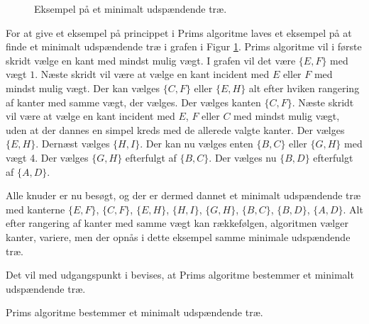 

\begin{figure}[!h]
  \centering
  \scalebox{0.8}{}
  \caption{Eksempel på et minimalt udspændende træ.}
  \label{eks_prim}
\end{figure}

\begin{exmp}
For at give et eksempel på princippet i Prims algoritme laves et eksempel på at finde et minimalt udspændende træ i grafen i Figur \ref{eks_prim}. 
Prims algoritme vil i første skridt vælge en kant med mindst mulig vægt. 
I grafen vil det være $\lbrace E,F \rbrace$ med vægt $1$. 
Næste skridt vil være at vælge en kant incident med $E$ eller $F$ med mindst mulig vægt. 
Der kan vælges $\lbrace C,F \rbrace$ eller $\lbrace E,H \rbrace$ alt efter hviken rangering af kanter med samme vægt, der vælges. 
Der vælges kanten $\lbrace C,F \rbrace$. 
Næste skridt vil være at vælge en kant incident med $E$, $F$ eller $C$ med mindst mulig vægt, uden at der dannes en simpel kreds med de allerede valgte kanter. 
Der vælges $\lbrace E,H \rbrace$. Dernæst vælges $\lbrace H,I \rbrace$. 
Der kan nu vælges enten $\lbrace B,C \rbrace$  eller $\lbrace G,H \rbrace$ med vægt 4. 
Der vælges $\lbrace G,H \rbrace$ efterfulgt af $\lbrace B,C \rbrace$. 
Der vælges nu $\lbrace B,D \rbrace$ efterfulgt af $\lbrace A,D \rbrace$.

Alle knuder er nu besøgt, og der er dermed dannet et minimalt udspændende træ med kanterne $\lbrace E,F \rbrace$, $\lbrace C,F \rbrace$, $\lbrace E,H \rbrace$, $\lbrace H,I \rbrace$, $\lbrace G,H \rbrace$, $\lbrace B,C \rbrace$, $\lbrace B,D \rbrace$, $\lbrace A,D \rbrace$. 
Alt efter rangering af kanter med samme vægt kan rækkefølgen, algoritmen vælger kanter, variere, men der opnås i dette eksempel samme minimale udspændende træ.
\end{exmp} 

Det vil med udgangspunkt i \citep{prim} bevises, at Prims algoritme bestemmer et minimalt udspændende træ.

\begin{thm}
Prims algoritme bestemmer et minimalt udspændende træ. 
\label{set_prim}
\end{thm}



